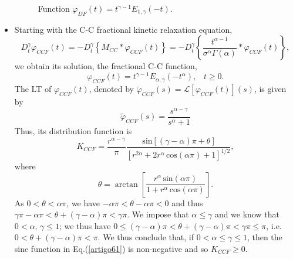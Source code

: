 \documentclass[12pt]{amsart}
\numberwithin{equation}{section}
\renewcommand{\sin}{\hspace{2pt}\textrm{sin}}
\renewcommand{\cos}{\hspace{2pt}\textrm{cos}}
\begin{document}
\begin{itemize}
\begin{figure}[H]
\center
{}
\qquad
{}
\caption{Function $\varphi_{DF}(t)= t^{\gamma-1}E_{1,\gamma}(-t)$.}
\label{artigo11}
\end{figure}
\item Starting with the C-C fractional kinetic relaxation equation,
\begin{equation}
D^{\gamma}_{t}\varphi_{CCF}(t)=- D^{\gamma}_{t}\left\{M_{CC}\ast\varphi_{CCF}(t)\right\}=- D^{\gamma}_{t}\left\{\frac{t^{\alpha-1}}{\sigma^{\alpha}\Gamma(\alpha)}\ast\varphi_{CCF}(t)\right\},
\label{ccf1}
\end{equation}
we obtain its solution, the fractional C-C function, 
\begin{equation}
\varphi_{CCF}(t)= t^{\gamma-1}E_{\alpha,\gamma}(-t^\alpha),
	\,\,\,\,\, t\geq0.
\label{artigo40}
\end{equation}
The LT of $\varphi_{CCF}(t)$, denoted by $\tilde{\varphi}_{CCF}(s)=
		\mathscr{L}[\varphi_{CCF}(t)](s)$, is given by 
\begin{equation}
\tilde{\varphi}_{CCF}(s)=\frac{s^{\alpha-\gamma}}{s^{\alpha}+1}
\end{equation}
Thus, its distribution function is 
\begin{equation}
K_{CCF}=\frac{r^{\alpha-\gamma}}{\pi}
	\frac{\sin[(\gamma-\alpha)\pi+\theta]}{[r^{2\alpha}+2r^{\alpha}\cos(\alpha \pi)+1]^{1/2}},
\label{artigo61}
\end{equation}
where 
\begin{equation}
\theta= \arctan\left[\frac{r^{\alpha}\sin(\alpha \pi)}{1+r^{\alpha}\cos(\alpha \pi)}\right].
\end{equation}
As $0 < \theta < \alpha \pi$, we have $-\alpha \pi < \theta - \alpha \pi <0$ and thus
$\gamma \pi - \alpha \pi < \theta + (\gamma - \alpha) \pi < \gamma \pi$. We impose
that $\alpha \leq \gamma$ and we know that $0 < \alpha, \, \gamma \leq 1$; we thus
have $0 \leq (\gamma -\alpha) \pi < \theta + (\gamma -\alpha) \pi < \gamma \pi \leq
\pi$, i.e. $0 < \theta + (\gamma -\alpha)\pi < \pi$. We thus conclude that, if $0 <
\alpha \leq \gamma \leq 1$, then the sine function in Eq.(\ref{artigo61}) is
non-negative and so $K_{CCF} \geq 0$. 


\end{itemize}
\end{document}

